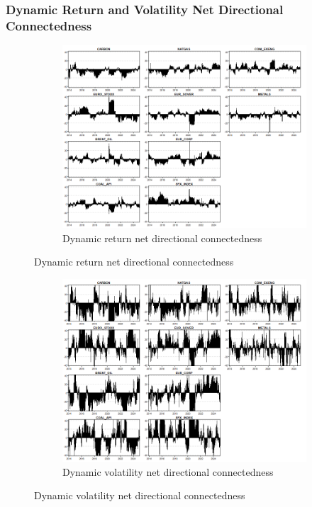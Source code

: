 \documentclass[preprint, 3p,
authoryear]{elsarticle} %
\begin{document}
\begin{landscape}
\subsubsection{Dynamic Return and Volatility Net Directional Connectedness}

\begin{figure}[H]
  \caption{Dynamic Net Directional Connectedness (Jan 2013 – Jan 2025)}
    \centering
      \begin{subfigure}[a]{\textwidth}
        \caption{Dynamic return net directional connectedness}
        \includegraphics[width = 1.25\linewidth]{11aApdxD-10-220-RetNDC}
      \end{subfigure}
\end{figure}
\begin{figure}[H]
  \ContinuedFloat
  \centering
      \begin{subfigure}[b]{\textwidth}
        \caption{Dynamic volatility net directional connectedness}
        \includegraphics[width = 1.25\linewidth]{11bApdxD-10-220-VolNDC}
      \end{subfigure}
\end{figure}




\end{landscape}
\end{document}
